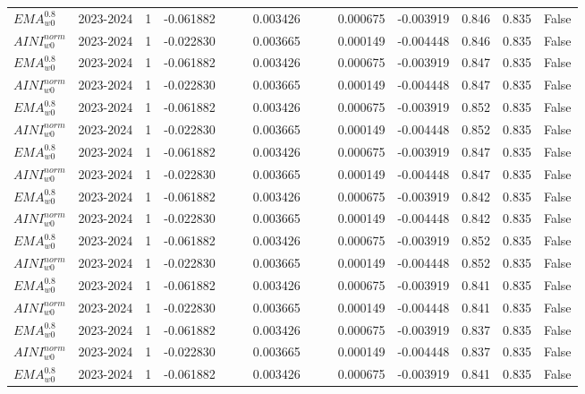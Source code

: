 \begin{tabular}{@{}llrrrrrrrrrlll@{}}
$EMA^{0.8}_{w0}$ & 2023-2024 & 1 & -0.061882 &  &  & 0.003426 &  &  & 0.000675 & -0.003919 & 0.846 & 0.835 & False \\
$AINI^{norm}_{w0}$ & 2023-2024 & 1 & -0.022830 &  &  & 0.003665 &  &  & 0.000149 & -0.004448 & 0.846 & 0.835 & False \\
$EMA^{0.8}_{w0}$ & 2023-2024 & 1 & -0.061882 &  &  & 0.003426 &  &  & 0.000675 & -0.003919 & 0.847 & 0.835 & False \\
$AINI^{norm}_{w0}$ & 2023-2024 & 1 & -0.022830 &  &  & 0.003665 &  &  & 0.000149 & -0.004448 & 0.847 & 0.835 & False \\
$EMA^{0.8}_{w0}$ & 2023-2024 & 1 & -0.061882 &  &  & 0.003426 &  &  & 0.000675 & -0.003919 & 0.852 & 0.835 & False \\
$AINI^{norm}_{w0}$ & 2023-2024 & 1 & -0.022830 &  &  & 0.003665 &  &  & 0.000149 & -0.004448 & 0.852 & 0.835 & False \\
$EMA^{0.8}_{w0}$ & 2023-2024 & 1 & -0.061882 &  &  & 0.003426 &  &  & 0.000675 & -0.003919 & 0.847 & 0.835 & False \\
$AINI^{norm}_{w0}$ & 2023-2024 & 1 & -0.022830 &  &  & 0.003665 &  &  & 0.000149 & -0.004448 & 0.847 & 0.835 & False \\
$EMA^{0.8}_{w0}$ & 2023-2024 & 1 & -0.061882 &  &  & 0.003426 &  &  & 0.000675 & -0.003919 & 0.842 & 0.835 & False \\
$AINI^{norm}_{w0}$ & 2023-2024 & 1 & -0.022830 &  &  & 0.003665 &  &  & 0.000149 & -0.004448 & 0.842 & 0.835 & False \\
$EMA^{0.8}_{w0}$ & 2023-2024 & 1 & -0.061882 &  &  & 0.003426 &  &  & 0.000675 & -0.003919 & 0.852 & 0.835 & False \\
$AINI^{norm}_{w0}$ & 2023-2024 & 1 & -0.022830 &  &  & 0.003665 &  &  & 0.000149 & -0.004448 & 0.852 & 0.835 & False \\
$EMA^{0.8}_{w0}$ & 2023-2024 & 1 & -0.061882 &  &  & 0.003426 &  &  & 0.000675 & -0.003919 & 0.841 & 0.835 & False \\
$AINI^{norm}_{w0}$ & 2023-2024 & 1 & -0.022830 &  &  & 0.003665 &  &  & 0.000149 & -0.004448 & 0.841 & 0.835 & False \\
$EMA^{0.8}_{w0}$ & 2023-2024 & 1 & -0.061882 &  &  & 0.003426 &  &  & 0.000675 & -0.003919 & 0.837 & 0.835 & False \\
$AINI^{norm}_{w0}$ & 2023-2024 & 1 & -0.022830 &  &  & 0.003665 &  &  & 0.000149 & -0.004448 & 0.837 & 0.835 & False \\
$EMA^{0.8}_{w0}$ & 2023-2024 & 1 & -0.061882 &  &  & 0.003426 &  &  & 0.000675 & -0.003919 & 0.841 & 0.835 & False \\

\end{tabular}
